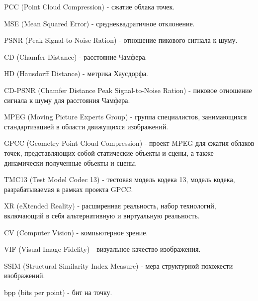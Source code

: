 PCC (Point Cloud Compression) - сжатие облака точек.

MSE (Mean Squared Error) - среднеквадратичное отклонение.

PSNR (Peak Signal-to-Noise Ration) - отношение пикового сигнала к шуму.

CD (Chamfer Distance) - расстояние Чамфера.

HD (Hausdorff Distance) - метрика Хаусдорфа.

CD-PSNR (Chamfer Distance Peak Signal-to-Noise Ration) - пиковое отношение
сигнала к шуму для расстояния Чамфера.

MPEG (Moving Picture Experts Group) - группа специалистов, занимающихся
стандартизацией в области движущихся изображений.

GPCC (Geometry Point Cloud Compression) - проект MPEG для сжатия облаков точек,
представляющих собой статические объекты и сцены, а также динамически полученные
объекты и сцены.

TMC13 (Test Model Codec 13) - тестовая модель кодека 13, модель кодека,
разрабатываемая в рамках проекта GPCC.

XR (eXtended Reality) - расширенная реальность, набор технологий, включающий в
себя альтернативную и виртуальную реальность.

CV (Computer Vision) - компьютерное зрение.

VIF (Visual Image Fidelity) - визуальное качество изображения.

SSIM (Structural Similarity Index Measure) - мера структурной похожести изображений.

bpp (bits per point) - бит на точку.